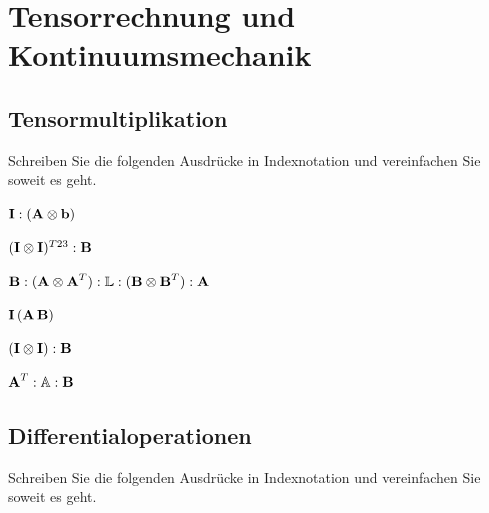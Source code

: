  \clearpage
 \setcounter{page}{1}
\section{Tensorrechnung und Kontinuumsmechanik \label{sec:tenkon}}


\subsection{Tensormultiplikation}

Schreiben Sie die folgenden Ausdrücke in Indexnotation und vereinfachen Sie soweit es geht.

\vspace{0.4cm}
\enab
\begin{minipage}[t]{0.5\textwidth}
 \item ${{\bm{\mathrm{I}}}} : ({{\bm{\mathrm{A}}}} \otimes {{\bm{\mathrm{b}}}})$
\item $({{\bm{\mathrm{I}}}} \otimes {{\bm{\mathrm{I}}}})^{T23} : {{\bm{\mathrm{B}}}} $
\item ${{\bm{\mathrm{B}}}} : ({{\bm{\mathrm{A}}}}\otimes {{\bm{\mathrm{A}}}}^T): \mathbb{L} : ({{\bm{\mathrm{B}}}} \otimes {{\bm{\mathrm{B}}}}^T) : {{\bm{\mathrm{A}}}}$
\end{minipage}
%
\begin{minipage}[t]{0.42\textwidth}
\item ${{\bm{\mathrm{I}}}} \, ({{\bm{\mathrm{A}}}} \, {{\bm{\mathrm{B}}}}) $
\item $({{\bm{\mathrm{I}}}} \otimes {{\bm{\mathrm{I}}}} ) : {{\bm{\mathrm{B}}}}$
\item ${{\bm{\mathrm{A}}}}^T : \mathbb{A}  : {{\bm{\mathrm{B}}}}$
\end{minipage}
\enae



\subsection{Differentialoperationen}

Schreiben Sie die folgenden Ausdrücke in Indexnotation und vereinfachen Sie soweit es geht.

\vspace{0.4cm}

